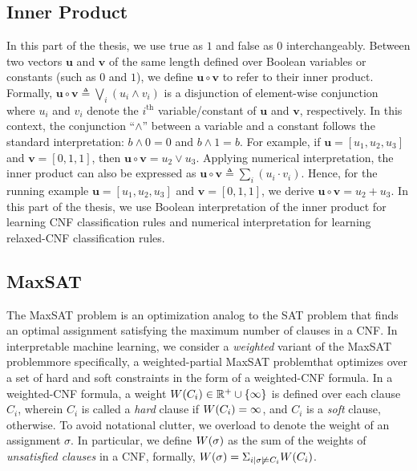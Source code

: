 \subsection{Inner Product}
In this part of the thesis, we use true as $ 1 $ and false as $ 0 $ interchangeably. Between two vectors  $\mathbf{u}$ and $\mathbf{v}$ of the same length defined over Boolean variables or constants (such as  $ 0 $ and $ 1 $), we define $\mathbf{u} \circ \mathbf{v} $  to refer to  their inner product. Formally, $\mathbf{u} \circ \mathbf{v} \triangleq \bigvee_{i} (u_{i} \wedge v_{i})$ is a disjunction of element-wise conjunction where $u_{i}$ and $v_{i}$ denote the $ i^\text{th} $ variable/constant of $\mathbf{u}$ and $\mathbf{v}$, respectively. In this context, the conjunction ``$\wedge$'' between a variable and a constant follows the standard interpretation: $b \wedge 0 = 0$ and $b \wedge 1 = b$.  For example, if $ \mathbf{u} = [u_1, u_2, u_3] $ and $ \mathbf{v} = [0,1,1] $, then $ \mathbf{u} \circ \mathbf{v} = u_2 \vee u_3 $. Applying numerical interpretation, the inner product can also be expressed as $\mathbf{u} \circ \mathbf{v} \triangleq \sum_{i} (u_{i} \cdot v_{i}) $. Hence, for the running example $ \mathbf{u} = [u_1, u_2, u_3] $ and $ \mathbf{v} = [0,1,1] $, we derive $ \mathbf{u} \circ \mathbf{v} = u_2  + u_3 $. In this part of the thesis, we use Boolean interpretation of the inner product for learning CNF classification rules and numerical interpretation for learning relaxed-CNF classification rules.




\subsection{MaxSAT}

The MaxSAT problem is an optimization analog to the SAT problem that finds an optimal assignment satisfying the maximum number of clauses in a CNF. In interpretable machine learning, we consider a \emph{weighted} variant of the MaxSAT problem\textemdash more specifically, a weighted-partial MaxSAT problem\textemdash that optimizes over a set of hard and soft constraints in the form of a weighted-CNF formula. In a weighted-CNF formula, a weight $ {W \! \left( C_i \right)} \in \mathbb{R}^+ \cup \{\infty\} $ is defined over each clause $ C_i $, wherein $C_i$ is called a \emph{hard} clause if $W \! \left( C_i \right) = \infty$, and  $C_i$ is  a \emph{soft} clause, otherwise.  To avoid notational clutter, we overload {\weight{\cdot}} to denote the weight of an assignment $ \sigma $. In particular, we define $W \! \left( \sigma \right)$ as the sum of the weights of \emph{unsatisfied clauses} in a CNF, formally, $W \! \left( \sigma \right) = \Sigma_{i | \sigma \not \models C_i} W \! \left( C_i \right)$.


